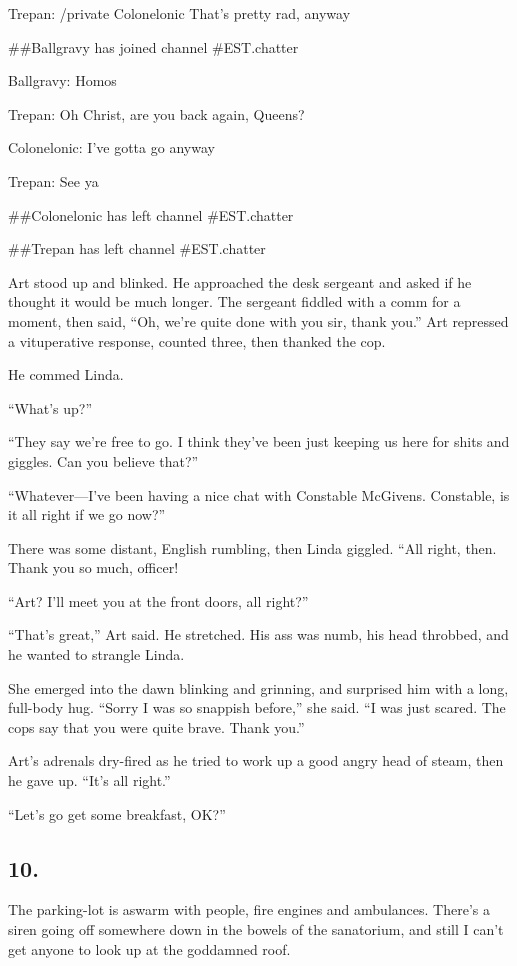 Trepan: /private Colonelonic That's pretty rad, anyway

\#\#Ballgravy has joined channel \#EST.chatter

Ballgravy: Homos

Trepan: Oh Christ, are you back again, Queens?

Colonelonic: I've gotta go anyway

Trepan: See ya

\#\#Colonelonic has left channel \#EST.chatter

\#\#Trepan has left channel \#EST.chatter

Art stood up and blinked. He approached the desk sergeant and asked
if he thought it would be much longer. The sergeant fiddled with a
comm for a moment, then said, “Oh, we’re quite done with you sir,
thank you.” Art repressed a vituperative response, counted three,
then thanked the cop.

He commed Linda.

“What’s up?”

“They say we’re free to go. I think they’ve been just keeping us
here for shits and giggles. Can you believe that?”

“Whatever—I’ve been having a nice chat with Constable McGivens.
Constable, is it all right if we go now?”

There was some distant, English rumbling, then Linda giggled. “All
right, then. Thank you so much, officer!

“Art? I’ll meet you at the front doors, all right?”

“That’s great,” Art said. He stretched. His ass was numb, his head
throbbed, and he wanted to strangle Linda.

She emerged into the dawn blinking and grinning, and surprised him
with a long, full-body hug. “Sorry I was so snappish before,” she
said. “I was just scared. The cops say that you were quite brave.
Thank you.”

Art’s adrenals dry-fired as he tried to work up a good angry head
of steam, then he gave up. “It’s all right.”

“Let’s go get some breakfast, OK?”

\subsection{10.}

The parking-lot is aswarm with people, fire engines and ambulances.
There’s a siren going off somewhere down in the bowels of the
sanatorium, and still I can’t get anyone to look up at the
goddamned roof.


